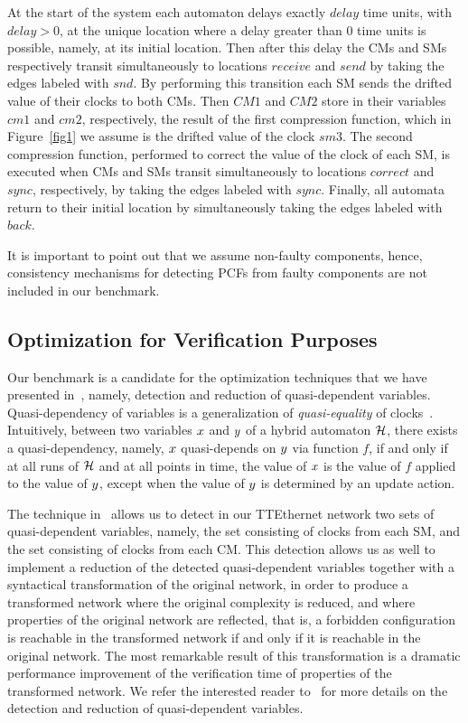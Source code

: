 At the start of the system each automaton delays exactly $\mathit{delay}$ time units, 
with $\mathit{delay}>0$, at the unique location where a delay greater than 0 time units is possible, namely, at 
its initial location. Then after this delay 
the CMs and SMs respectively transit simultaneously to locations $\mathit{receive}$ and 
$\mathit{send}$ by taking the edges labeled with $\mathit{snd}$.
By performing this transition each SM sends the drifted value of their clocks to both CMs. 
Then $\mathit{CM1}$ and $\mathit{CM2}$ store in their variables $\mathit{cm1}$
and $\mathit{cm2}$, respectively, the result of the first compression function, which in Figure~\ref{fig1}
we assume is the drifted value of the clock $\mathit{sm3}$. 
The second compression function, performed to correct the value of the clock of each SM, 
is executed when CMs and SMs transit simultaneously to locations
$\mathit{correct}$ and $\mathit{sync}$, respectively, by taking the edges labeled with $\mathit{sync}$.
Finally, all automata return to their initial location by simultaneously taking the 
edges labeled with $\mathit{back}$.

It is important to point out that we assume non-faulty components, hence, 
consistency mechanisms for detecting PCFs from faulty components are not included in our benchmark.

\subsection{Optimization for Verification Purposes}

Our benchmark is a candidate for the optimization techniques that we have presented in~\cite{Herrera3}, namely,
detection and reduction of quasi-dependent variables. Quasi-dependency of variables is a generalization 
of \emph{quasi-equality} of clocks~\cite{Herrera,Herrera2,Herrera4}. Intuitively, between two variables $x$ and $y$ 
of a hybrid automaton $\mathcal{H}$, there exists a quasi-dependency, namely, $x$ quasi-depends
on $y$ via function $f$, if and only if at all runs of $\mathcal{H}$ and at all points in time,
the value of $x$ is the value of $f$ applied to the value of $y$, except when the value of 
$y$ is determined by an update action. 

The technique in~\cite{Herrera3} allows us to detect in our TTEthernet 
network two sets of quasi-dependent variables, namely,
the set consisting of clocks from each SM, and the set consisting of clocks from each CM. 
This detection allows us as well to implement a reduction of 
the detected quasi-dependent variables together with a syntactical transformation of 
the original network, in order to produce a transformed network where the original complexity is reduced,
and where properties of the original network are reflected, that is, a forbidden configuration is reachable in
the transformed network if and only if it is reachable in the original network. The most remarkable result of this 
transformation is a dramatic performance improvement of the verification time of properties of the transformed network. 
We refer the interested reader to~\cite{Herrera3} for more details on the detection and reduction of quasi-dependent
variables. 

